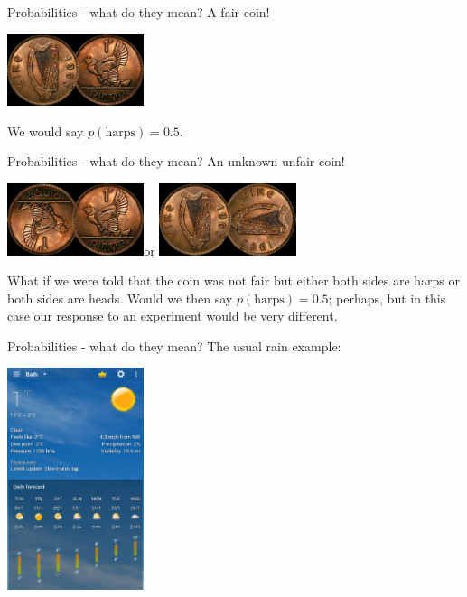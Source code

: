\documentclass{beamer}
\newcommand{\cor}{\color{reddish}{}}
\newcommand{\cob}{\color{black}{}}
\begin{document}
\begin{frame}{Probabilities - what do they mean?}
A fair coin!
  \begin{center}
    \includegraphics[width=4cm]{coin.jpg}
  \end{center}
We would say \cor{}$p(\mbox{harps})=0.5$\cob.
\end{frame}



\begin{frame}{Probabilities - what do they mean?}
An unknown unfair coin!
  \begin{center}
    \includegraphics[width=4cm]{coin_2tail.png}\qquad or \qquad\includegraphics[width=4cm]{coin_2harp.png}
  \end{center}
What if we were told
that the coin was not fair but either both sides are harps or both
sides are heads. Would we then say \cor{}$p(\mbox{harps})=0.5$\cob;
perhaps, but in this case our response to an experiment would be very
different.
\end{frame}



\begin{frame}{Probabilities - what do they mean?}
The usual rain example:
  \begin{center}
    \includegraphics[width=4cm]{rain1.png}
\end{center}
\end{frame}
\end{document}
